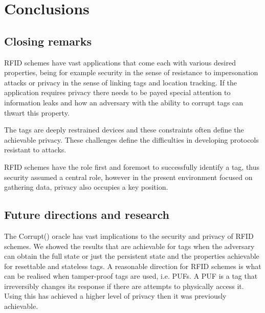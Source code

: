 \chapter*{Conclusions} 

\section*{Closing remarks}
RFID schemes have vast applications that come each with various desired properties, being for example security in the sense of resistance to impersonation attacks 
or privacy in the sense of linking tags and location tracking. If the application requires privacy there needs to be payed special attention to information leaks
and how an adversary with the ability to corrupt tags can thwart this property.

The tags are deeply restrained devices and these constraints often define the achievable privacy. These challenges define the difficulties in developing protocols
resistant to attacks.

RFID schemes have the role first and foremost to successfully identify a tag, thus security assumed a central role, however in the present environment focused on 
gathering data, privacy also occupies a key position.

\section*{Future directions and research}
The Corrupt() oracle has vast implications to the security and privacy of RFID schemes. We showed the results that are achievable for tags
when the adversary can obtain the full state or just the persistent state and the properties achievable for resettable and stateless tags.
A reasonable direction for RFID schemes is what can be realised when tamper-proof tags are used, i.e. PUFs. A PUF is a tag that irreversibly changes 
its response if there are attempts to physically access it. Using this \cite{PUFs} has achieved a higher level of privacy then it was 
previously achievable.